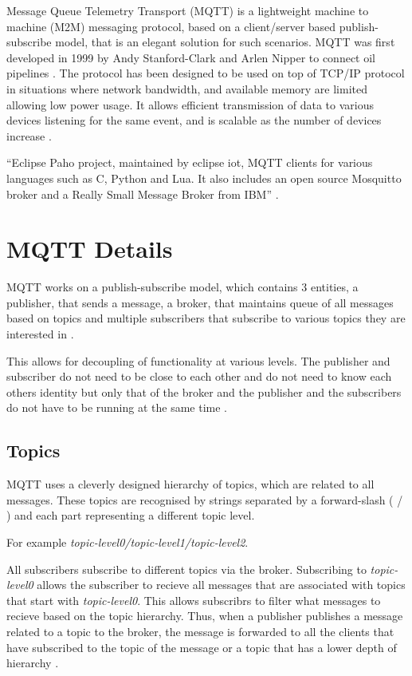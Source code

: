 \documentclass[sigconf]{acmart}
\begin{document}
Message Queue Telemetry Transport (MQTT) is a lightweight machine to
machine (M2M) messaging protocol, based on a client/server based
publish-subscribe model, that is an elegant solution for such
scenarios. MQTT was first developed in 1999 by Andy Stanford-Clark and
Arlen Nipper to connect oil pipelines \cite{hivemq-website}. The
protocol has been designed to be used on top of TCP/IP protocol in
situations where network bandwidth, and available memory are limited
allowing low power usage. It allows efficient transmission of data to
various devices listening for the same event, and is scalable as the
number of devices increase \cite{mqtt-wiki}\cite{mqtt-official}.

``Eclipse Paho project, maintained by eclipse iot, MQTT clients for
various languages such as C, Python and Lua. It also includes an open
source Mosquitto broker and a Really Small Message Broker from IBM''
\cite{mqtt-official}\cite{eclipse-mosquitto}.


\section{MQTT Details}

MQTT works on a publish-subscribe model, which contains 3 entities, a
publisher, that sends a message, a broker, that maintains queue of all
messages based on topics and multiple subscribers that subscribe to
various topics they are interested in \cite{how-mqtt-works}.

This allows for decoupling of functionality at various levels. The
publisher and subscriber do not need to be close to each other and do
not need to know each others identity but only that of the broker and
the publisher and the subscribers do not have to be running at the
same time \cite{hivemq-details}.

\subsection{Topics}

MQTT uses a cleverly designed hierarchy of topics, which are related
to all messages. These topics are recognised by strings separated by a
forward-slash ( / ) and each part representing a different topic
level.

For example {\em topic-level0/topic-level1/topic-level2}.

All subscribers subscribe to different topics via the broker.
Subscribing to {\em topic-level0} allows the subscriber to recieve all
messages that are associated with topics that start with {\em
  topic-level0}. This allows subscribrs to filter what messages to
recieve based on the topic hierarchy. Thus, when a publisher publishes
a message related to a topic to the broker, the message is forwarded
to all the clients that have subscribed to the topic of the message or
a topic that has a lower depth of hierarchy \cite{hivemq-details}
\cite{how-mqtt-works}.
\end{document}
